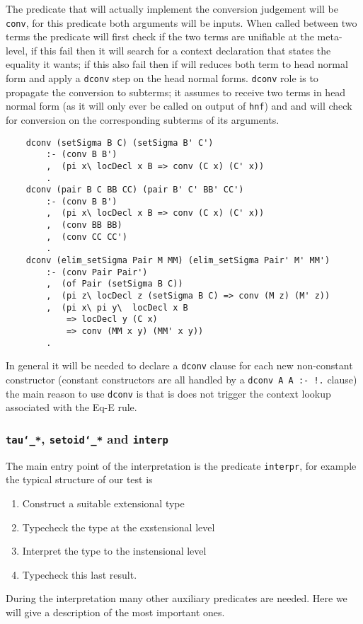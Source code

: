 	The predicate that will actually implement the conversion judgement will be \verb|conv|, for this predicate both arguments will be inputs. When called between two terms the predicate will first check if the two terms are unifiable at the meta-level, if this fail then it will search for a context declaration that states the equality it wants; if this also fail then if will reduces both term to head normal form and apply a \verb|dconv| step on the head normal forms. \verb|dconv| role is to propagate the conversion to subterms; it assumes to receive two terms in head normal form (as it will only ever be called on output of \verb|hnf|) and and will check for conversion on the corresponding subterms of its arguments.
	\begin{verbatim}
	dconv (setSigma B C) (setSigma B' C') 
	    :- (conv B B')
	    ,  (pi x\ locDecl x B => conv (C x) (C' x))
	    .
	dconv (pair B C BB CC) (pair B' C' BB' CC') 
	    :- (conv B B')
	    ,  (pi x\ locDecl x B => conv (C x) (C' x))
	    ,  (conv BB BB)
	    ,  (conv CC CC')
	    .
	dconv (elim_setSigma Pair M MM) (elim_setSigma Pair' M' MM') 
	    :- (conv Pair Pair')
	    ,  (of Pair (setSigma B C))
	    ,  (pi z\ locDecl z (setSigma B C) => conv (M z) (M' z))
	    ,  (pi x\ pi y\  locDecl x B 
	        => locDecl y (C x) 
	        => conv (MM x y) (MM' x y))
	    .
	\end{verbatim}
	In general it will be needed to declare a \verb|dconv| clause for each new non-constant constructor (constant constructors are all handled by a \verb|dconv A A :- !.| clause) the main reason to use \verb|dconv| is that is does not trigger the context lookup associated with the Eq-E rule.
	\subsubsection{\texttt{tau\char`_*}, \texttt{setoid\char`_*} and \texttt{interp}}
	The main entry point of the interpretation is the predicate \verb|interpr|, for example the typical structure of our test is \begin{enumerate}
		\item Construct a suitable extensional type
		\item Typecheck the type at the exstensional level
		\item  Interpret the type to the instensional level
		\item Typecheck this last result.
	\end{enumerate}
	During the interpretation many other auxiliary predicates are needed. Here we will give a description of the most important ones.
	
